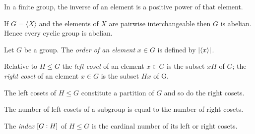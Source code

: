 \vspace{2mm}

\begin{proposition}
	In a finite group, the inverse of an element is a positive power of that element.
\end{proposition}



\vspace{2mm}


\vspace{2mm}

\begin{proposition}
	If $G = \langle X \rangle$ and the elements of $X$ are pairwise interchangeable then $G$ is abelian. Hence every cyclic group is abelian.
\end{proposition}

\vspace{2mm}

\begin{definition}
	Let $G$ be a group. The \emph{order of an element} $x \in G$ is defined by $\abs[0]{\langle x \rangle}$.
\end{definition}

\vspace{2mm}

\begin{definition}
	Relative to $H \leq G$ the \emph{left coset} of an element $x \in G$ is the subset $xH$ of $G$; the \emph{right coset} of an element $x \in G$ is the subset $Hx$ of G.
\end{definition}

\vspace{2mm}

\begin{proposition}
	The left cosets of $H \leq G$ constitute a partition of $G$ and so do the right cosets.	
\end{proposition}

\vspace{2mm}

\begin{proposition}
	The number of left cosets of a subgroup is equal to the number of right cosets.
\end{proposition}

\vspace{2mm}

\begin{definition}
	The \emph{index} $\intcc{G:H}$ of $H \leq G$ is the cardinal number of its left or right cosets.
\end{definition}

